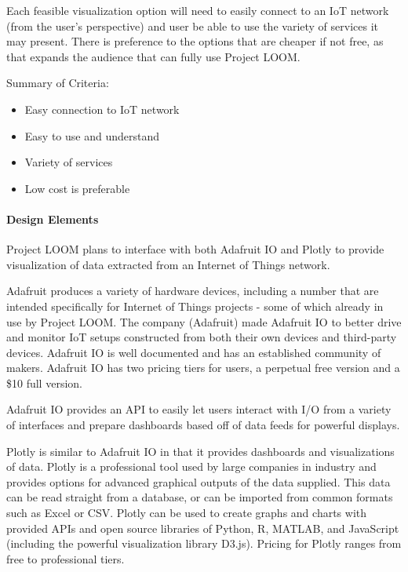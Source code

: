 \documentclass[onecolumn, draftclsnofoot,10pt, compsoc]{IEEEtran}
\begin{document}
    Each feasible visualization option will need to easily connect to an IoT network (from the user's perspective) and user be able to use the variety of services it may present. There is preference to the options that are cheaper if not free, as that expands the audience that can fully use Project LOOM.

    Summary of Criteria:
    \begin{itemize}[noitemsep,topsep=-10pt]
        \item Easy connection to IoT network
        \item Easy to use and understand
        \item Variety of services
        \item Low cost is preferable
    \end{itemize}

\paragraph{Design Elements}
    Project LOOM plans to interface with both Adafruit IO and Plotly to provide visualization of data extracted from an Internet of Things network.

    Adafruit produces a variety of hardware devices, including a number that are intended specifically for Internet of Things projects - some of which already in use by Project LOOM. The company (Adafruit) made Adafruit IO to better drive and monitor IoT setups constructed from both their own devices and third-party devices. Adafruit IO is well documented and has an established community of makers. Adafruit IO has two pricing tiers for users, a perpetual free version and a \$10 full version.

    Adafruit IO provides an API to easily let users interact with I/O from a variety of interfaces and prepare dashboards based off of data feeds for powerful displays. \cite{adafruitio}

    Plotly is similar to Adafruit IO in that it provides dashboards and visualizations of data. Plotly is a professional tool used by large companies in industry and provides options for advanced graphical outputs of the data supplied. This data can be read straight from a database, or can be imported from common formats such as Excel or CSV. Plotly can be used to create graphs and charts with provided APIs and open source libraries of Python, R, MATLAB, and JavaScript (including the powerful visualization library D3.js). Pricing for Plotly ranges from free to professional tiers. \cite{plotly}
\end{document}
